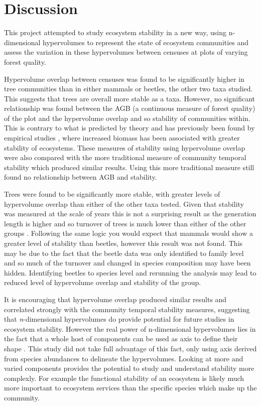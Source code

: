 
\section{Discussion}

This project attempted to study ecosystem stability in a new way, using n-dimensional hypervolumes to represent the state of ecosystem communities and assess the variation in these hypervolumes between censuses at plots of varying forest quality.  

Hypervolume overlap between censuses was found to be significantly higher in tree communities than in either mammals or beetles, the other two taxa studied. This suggests that trees are overall more stable as a taxa. However, no significant relationship was found between the AGB (a continuous measure of forest quality) of the plot and the hypervolume overlap and so stability of communities within. This is contrary to what is predicted by theory \citep{MacArthur1955, Hughes2000a} and has previously been found by empirical studies \citep{Tilman2006, Ives2007}, where increased biomass has been associated with greater stability of ecosystems. These measures of stability using hypervolume overlap were also compared with the more traditional measure of community temporal stability \citep{Lehman2000} which produced similar results. Using this more traditional measure still found no relationship between AGB and stability. 

Trees were found to be significantly more stable, with greater levels of hypervolume overlap than either of the other taxa tested. Given that stability was measured at the scale of years this is not a surprising result as the generation length is higher and so turnover of trees is much lower than either of the other groups \citep{Connell1983, Pimm1984}. Following the same logic you would expect that mammals would show a greater level of stability than beetles, however this result was not found. This may be due to the fact that the beetle data was only identified to family level and so much of the turnover and changed in species composition may have been hidden. Identifying beetles to species level and rerunning the analysis may lead to reduced level of hypervolume overlap and stability of the group.

It is encouraging that hypervolume overlap produced similar results and correlated strongly with the community temporal stability measures, suggesting that \emph{n}-dimensional hypervolumes do provide potential for future studies in ecosystem stability. However the real power of n-dimensional hypervolumes lies in the fact that a whole host of components can be used as axis to define their shape \citep{Blonder2014, Barros2016}. This study did not take full advantage of this fact, only using axis derived from species abundances to delineate the hypervolumes. Looking at more and varied components provides the potential to study and understand stability more complexly. For example the functional stability of an ecosystem is likely much more important to ecosystem services than the specific species which make up the community.

